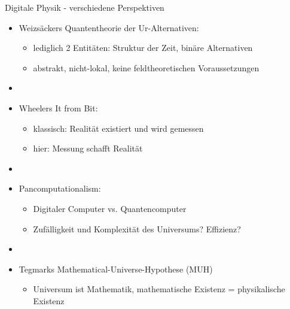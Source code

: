 \documentclass[aspectratio=1610, 9pt]{beamer}
\begin{document}
\begin{frame}{Digitale Physik - verschiedene Perspektiven}
  \begin{itemize}
    \item Weizsäckers Quantentheorie der Ur-Alternativen:
      \begin{itemize}
        \item[\bullet] lediglich 2  Entitäten: Struktur der Zeit, binäre Alternativen
        \item[\bullet] abstrakt, nicht-lokal, keine feldtheoretischen Voraussetzungen
      \end{itemize}
    \item[]
    \item Wheelers It from Bit:
      \begin{itemize}
        \item[\bullet] klassisch: Realität existiert und wird gemessen
        \item[\bullet] hier: Messung schafft Realität
      \end{itemize}
    \item[]
    \item Pancomputationalism:
      \begin{itemize}
        \item[\bullet] Digitaler Computer vs. Quantencomputer
        \item[\bullet] Zufälligkeit und Komplexität des Universums? Effizienz?
      \end{itemize}
    \item[]
    \item Tegmarks Mathematical-Universe-Hypothese (MUH)
      \begin{itemize}
        \item[\bullet] Universum ist Mathematik, mathematische Existenz = physikalische Existenz
      \end{itemize}
  \end{itemize}
\end{frame}
\end{document}
